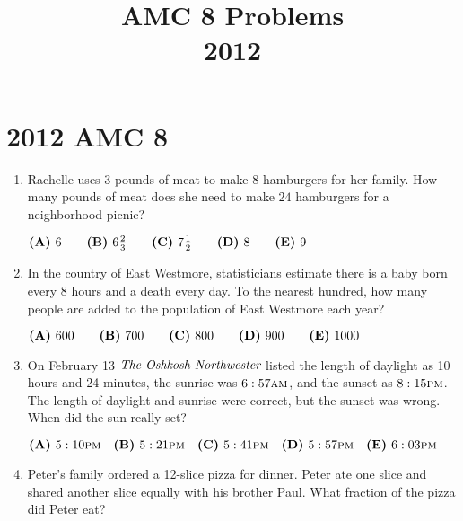 \documentclass{article}
\title{AMC 8 Problems \\ 2012}
\date{}
\begin{document}
\maketitle\thispagestyle{fancy}\newpage\section*{2012 AMC 8}\begin{enumerate}[label=\arabic*., itemsep=0.5em]\item Rachelle uses \( 3 \) pounds of meat to make \( 8 \) hamburgers for her family. How many pounds of meat does she need to make \( 24 \) hamburgers for a neighborhood picnic?

\( \textbf{(A)}\hspace{.05in}6\qquad\textbf{(B)}\hspace{.05in}6\frac{2}3\qquad\textbf{(C)}\hspace{.05in}7\frac{1}2\qquad\textbf{(D)}\hspace{.05in}8\qquad\textbf{(E)}\hspace{.05in}9 \)\par \vspace{0.5em}\item In the country of East Westmore, statisticians estimate there is a baby born every \( 8 \) hours and a death every day. To the nearest hundred, how many people are added to the population of East Westmore each year?

\( \textbf{(A)}\hspace{.05in}600\qquad\textbf{(B)}\hspace{.05in}700\qquad\textbf{(C)}\hspace{.05in}800\qquad\textbf{(D)}\hspace{.05in}900\qquad\textbf{(E)}\hspace{.05in}1000 \)\par \vspace{0.5em}\item On February 13 \(\emph{The Oshkosh Northwester}\) listed the length of daylight as 10 hours and 24 minutes, the sunrise was \( 6:57\textsc{am} \), and the sunset as \( 8:15\textsc{pm} \). The length of daylight and sunrise were correct, but the sunset was wrong. When did the sun really set?

\( \textbf{(A)}\hspace{.05in}5:10\textsc{pm}\quad\textbf{(B)}\hspace{.05in}5:21\textsc{pm}\quad\textbf{(C)}\hspace{.05in}5:41\textsc{pm}\quad\textbf{(D)}\hspace{.05in}5:57\textsc{pm}\quad\textbf{(E)}\hspace{.05in}6:03\textsc{pm} \)\par \vspace{0.5em}\item Peter's family ordered a 12-slice pizza for dinner. Peter ate one slice and shared another slice equally with his brother Paul. What fraction of the pizza did Peter eat?


\end{enumerate}
\end{document}
